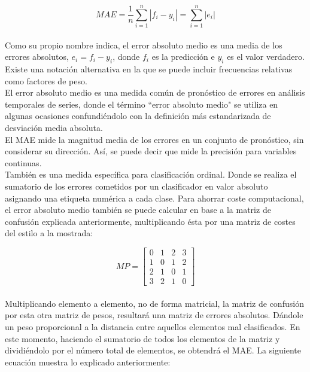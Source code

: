 			\begin{equation}
				MAE = \frac{1}{n} \sum_{i=1}^n{\left |{f_i-y_i}\right |} = \sum_{i=1}^n{\left |{e_i}\right |}
				\label{MAE}
			\end{equation}
			\\
			
			Como su propio nombre indica, el error absoluto medio es una media de los errores absolutos, $ e_i = f_i-y_i $, donde $ f_i $ es la predicción e $ y_i $ es el valor verdadero. Existe una notación alternativa en la que se puede incluir frecuencias relativas como factores de peso.\\

			El error absoluto medio es una medida común de pronóstico de errores en análisis temporales de series, donde el término ``error absoluto medio" se utiliza en algunas ocasiones confundiéndolo con la definición más estandarizada de desviación media absoluta.\\

			El MAE mide la magnitud media de los errores en un conjunto de pronóstico, sin considerar su dirección. Así, se puede decir que mide la precisión para variables continuas.\\
			
			También es una medida específica para clasificación ordinal. Donde se realiza el sumatorio de los  errores cometidos por un clasificador en valor absoluto asignando una etiqueta numérica a cada clase. Para ahorrar coste computacional, el error absoluto medio también se puede calcular en base a la matriz de confusión explicada anteriormente, multiplicando ésta por una matriz de costes del estilo a la mostrada:
			
			\begin{equation}
				MP = 
					\begin{bmatrix}
						{0}&{1}&{2}&{3}\\
						{1}&{0}&{1}&{2}\\
						{2}&{1}&{0}&{1}\\
						{3}&{2}&{1}&{0}
					\end{bmatrix}
				\label{matriz_pesos}
			\end{equation}
			\\
			
			Multiplicando elemento a elemento, no de forma matricial, la matriz de confusión por esta otra matriz de pesos, resultará una matriz de errores absolutos. Dándole un peso proporcional a la distancia entre aquellos elementos mal clasificados. En este momento, haciendo el sumatorio de todos los elementos de la matriz y dividiéndolo por el número total de elementos, se obtendrá el MAE. La siguiente ecuación muestra lo explicado anteriormente:
			
